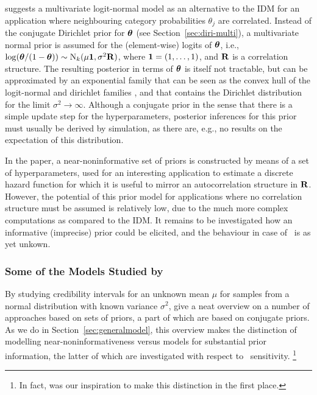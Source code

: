 \textcite{2009:bickis} suggests a multivariate logit-normal model as an alternative to the IDM
for an application where neighbouring category probabilities $\theta_j$ are correlated.
Instead of the conjugate Dirichlet prior for $\boldsymbol{\theta}$ (see Section~\ref{sec:diri-multi}),
a multivariate normal prior is assumed for the (element-wise) logits of $\boldsymbol{\theta}$,
i.e., $\log(\boldsymbol{\theta}/(1-\boldsymbol{\theta})) \sim \operatorname{N}_k(\mu \mathbf{1}, \sigma^2\mathbf{R})$,
where $\mathbf{1} = (1, \ldots, 1)$, and $\mathbf{R}$ is a correlation structure.
The resulting posterior in terms of $\boldsymbol{\theta}$ is itself not tractable, but can be approximated
by an exponential family that can be seen as the convex hull of the logit-normal
and dirichlet families \parencite[p.~189]{2009:bickis},
and that contains the Dirichlet distribution for the limit $\sigma^2 \to \infty$.
Although a conjugate prior in the sense that there is a simple update step for the hyperparameters,
posterior inferences for this prior must usually be derived by simulation,
as there are, e.g., no results on the expectation of this distribution.

In the paper, a near-noninformative set of priors is constructed
by means of a set of hyperparameters,
used for an interesting application to estimate a discrete hazard function
for which it is useful to mirror an autocorrelation structure in $\mathbf{R}$.
However, the potential of this prior model for applications where no correlation structure must be assumed is
relatively low, due to the much more complex computations as compared to the IDM.
It remains to be investigated how an informative (imprecise) prior could be elicited,
and the behaviour in case of \pdc\ is as yet unkown.


\subsubsection{Some of the Models Studied by \texorpdfstring{\textcite{1991:pericchi}}{Pericchi and Walley (1991)}}
\label{sec:alternatives:pericchi}

By studying credibility intervals for an unknown mean $\mu$ for samples from a normal distribution with known variance $\sigma^2$,
\textcite{1991:pericchi} give a neat overview on a number of approaches based on sets of priors,
a part of which are based on conjugate priors.
As we do in Section~\ref{sec:generalmodel},
this overview makes the distinction of modelling near-noninformativeness
versus models for substantial prior information,
the latter of which are investigated with respect to \pdc\ sensitivity.%
\footnote{In fact, \textcite{1991:pericchi} was our inspiration to make this distinction in the first place.}

